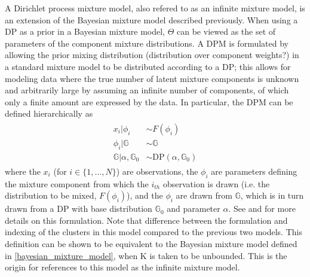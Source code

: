 \documentclass{article}
\begin{document}
A Dirichlet process mixture model, also refered to as an infinite mixture model, is an extension of the Bayesian mixture model described previously. 
When using a DP as a prior in a Bayesian mixture model, $\Theta$ can be viewed as the set of parameters of the component mixture distributions.
%
A DPM is formulated by allowing the prior mixing distribution (distribution over component weights?) in a standard mixture model to be distributed according to a DP; this allows for modeling data where the true number of latent mixture components is unknown and arbitrarily large by assuming an infinite number of components, of which only a finite amount are expressed by the data. In particular, the DPM can be defined hierarchically as
\begin{align}
\begin{split}
	x_{i}|\phi_{i} &\sim F(\phi_{i}) \\
	\phi_{i} | \mathbb{G}  &\sim  \mathbb{G} \\
	\mathbb{G} | \alpha, \mathbb{G}_{0}  &\sim  \text{DP}(\alpha, \mathbb{G}_{0})
\end{split}
\end{align}
where the $x_{i}$ (for $i \in \{ 1, \ldots, N \}$) are observations, the $\phi_{i}$ are parameters defining the mixture component from which the $i_{th}$ observation is drawn (i.e. the distribution to be mixed, $F(\phi_{i})$), and the $\phi_{i}$ are drawn from $\mathbb{G}$, which is in turn drawn from a DP with base distribution $\mathbb{G}_{0}$ and parameter $\alpha$. See \cite{gasthaus_2008} and \cite{gasthaus_thesis} for more details on this formulation. Note that difference between the formulation and indexing of the clusters in this model compared to the previous two models. This definition can be shown to be equivalent to the Bayesian mixture model defined in \eqref{bayesian_mixture_model}, when K is taken to be unbounded. This is the origin for references to this model as the infinite mixture model.
\end{document}

